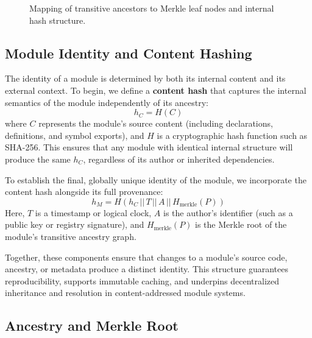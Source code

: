 \documentclass[sigplan,screen]{acmart}
\begin{document}
\begin{figure}[t]
\caption{Mapping of transitive ancestors to Merkle leaf nodes and internal hash structure.}
\label{fig:merkle-ancestors}
\end{figure}

\subsection{Module Identity and Content Hashing}
\label{sec:module-identity}

The identity of a module is determined by both its internal content and its external context. To begin, we define a \textbf{content hash} that captures the internal semantics of the module independently of its ancestry:
\[
h_C = H(C)
\]
where $C$ represents the module's source content (including declarations, definitions, and symbol exports), and $H$ is a cryptographic hash function such as SHA-256. This ensures that any module with identical internal structure will produce the same $h_C$, regardless of its author or inherited dependencies.

To establish the final, globally unique identity of the module, we incorporate the content hash alongside its full provenance:
\[
h_M = H(h_C \, || \, T \, || \, A \, || \, H_{\text{merkle}}(P))
\]
Here, $T$ is a timestamp or logical clock, $A$ is the author's identifier (such as a public key or registry signature), and $H_{\text{merkle}}(P)$ is the Merkle root of the module's transitive ancestry graph.

Together, these components ensure that changes to a module's source code, ancestry, or metadata produce a distinct identity. This structure guarantees reproducibility, supports immutable caching, and underpins decentralized inheritance and resolution in content-addressed module systems.

\subsection{Ancestry and Merkle Root}
\end{document}
